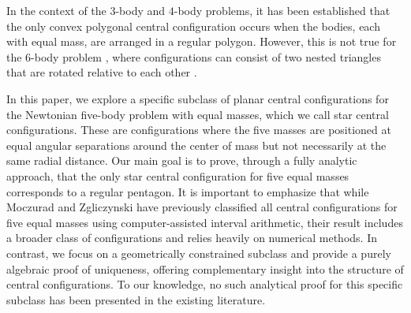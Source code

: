 \documentclass[final,11pt]{article}
\numberwithin{equation}{section}
\theoremstyle{definition}
\begin{document}
In the context of the $3$-body \cite{MR3297886} and $4$-body \cite{MR2386651} problems, it has been established that the only convex polygonal central configuration occurs when the bodies, each with equal mass, are arranged in a regular polygon. However, this is not true for the $6$-body problem \cite{MR1942919}, where configurations can consist of two nested triangles that are rotated relative to each other \cite{MR1963764}. 


In this paper, we explore a specific subclass of planar central configurations for the Newtonian five-body problem with equal masses, which we call star central configurations. These are configurations where the five masses are positioned at equal angular separations around the center of mass but not necessarily at the same radial distance. Our main goal is to prove, through a fully analytic approach, that the only star central configuration for five equal masses corresponds to a regular pentagon.
It is important to emphasize that while Moczurad and Zgliczynski \cite{MR4017363} have previously classified all central configurations for five equal masses using computer-assisted interval arithmetic, their result includes a broader class of configurations and relies heavily on numerical methods. In contrast, we focus on a geometrically constrained subclass and provide a purely algebraic proof of uniqueness, offering complementary insight into the structure of central configurations. To our knowledge, no such analytical proof for this specific subclass has been presented in the existing literature.

\end{document}
